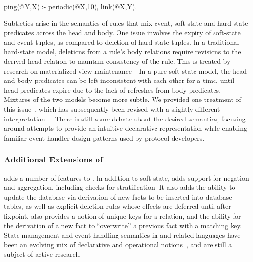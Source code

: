 \begin{NDlog}
ping(@Y,X) :- periodic(@X,10), link(@X,Y).
\end{NDlog}

Subtleties arise in the semantics of rules that mix event, soft-state
and hard-state predicates across the head and body.  One issue
involves the expiry of soft-state and event tuples, as compared to
deletion of hard-state tuples. In a traditional hard-state model,
deletions from a rule's body relations require revisions to the
derived head relation to maintain consistency of the rule.  This is
treated by research on materialized view
maintenance~\cite{rossMatviews}.  In a pure soft state model, the head
and body predicates can be left inconsistent with each other for a
time, until head predicates expire due to the lack of refreshes from
body predicates. Mixtures of the two models become more subtle.  We
provided one treatment of this issue~\cite{boonThesis}, which has
subsequently been revised with a slightly different interpretation
~\cite{evitaRaced}. There is still some debate about the desired
semantics, focusing around attempts to provide an intuitive
declarative representation while enabling familiar event-handler
design patterns used by protocol developers.



% 

\subsubsection{Additional Extensions of \Overlog}
\Overlog adds a number of features to \Dlog.  In addition to soft state, \Overlog adds support for negation and aggregation, including checks for stratification.  It also adds the ability to update the database via derivation of new facts to be inserted into database tables, as well as explicit deletion rules whose effects are deferred until after fixpoint.  \Overlog also provides a notion of unique keys for a relation, and the ability for the derivation of a new fact to ``overwrite'' a previous fact with a matching key.  State management and event handling semantics in \Overlog and related languages have been an evolving mix of declarative and operational notions~\cite{declareOverlays,dsn,navarro,evita,boom}, and are still a subject of active research.
